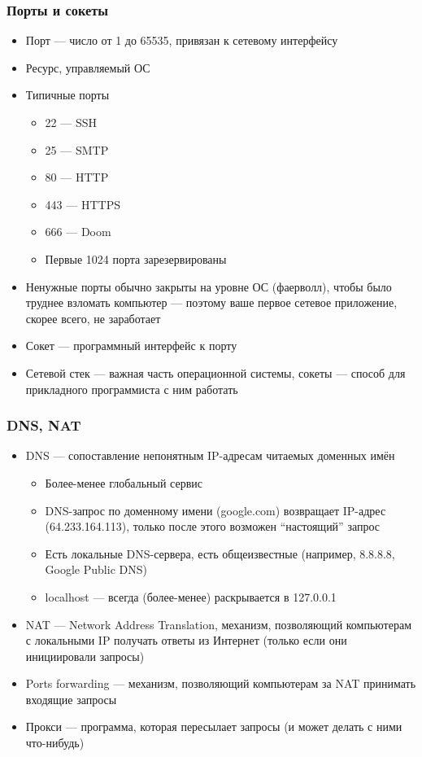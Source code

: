 \documentclass{../../slides-style}
\begin{document}
    \begin{frame}
        \frametitle{Порты и сокеты}
        \begin{itemize}
            \item Порт --- число от 1 до 65535, привязан к сетевому интерфейсу
            \item Ресурс, управляемый ОС
            \item Типичные порты
            \begin{itemize}
                \item 22 --- SSH
                \item 25 --- SMTP
                \item 80 --- HTTP
                \item 443 --- HTTPS
                \item 666 --- Doom
                \item Первые 1024 порта зарезервированы
            \end{itemize}
            \item Ненужные порты обычно закрыты на уровне ОС (фаерволл), чтобы было труднее взломать компьютер --- поэтому ваше первое сетевое приложение, скорее всего, не заработает
            \item Сокет --- программный интерфейс к порту
            \item Сетевой стек --- важная часть операционной системы, сокеты --- способ для прикладного программиста с ним работать
        \end{itemize}
    \end{frame}

    \begin{frame}
        \frametitle{DNS, NAT}
        \begin{itemize}
            \item DNS --- сопоставление непонятным IP-адресам читаемых доменных имён
            \begin{itemize}
                \item Более-менее глобальный сервис
                \item DNS-запрос по доменному имени (google.com) возвращает IP-адрес (64.233.164.113), только после этого возможен ``настоящий'' запрос
                \item Есть локальные DNS-сервера, есть общеизвестные (например, 8.8.8.8, Google Public DNS)
                \item localhost --- всегда (более-менее) раскрывается в 127.0.0.1
            \end{itemize}
            \item NAT --- Network Address Translation, механизм, позволяющий компьютерам с локальными IP получать ответы из Интернет (только если они инициировали запросы)
            \item Ports forwarding --- механизм, позволяющий компьютерам за NAT принимать входящие запросы
            \item Прокси --- программа, которая пересылает запросы (и может делать с ними что-нибудь)
        \end{itemize}
    \end{frame}
\end{document}
